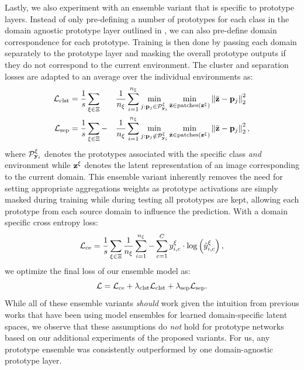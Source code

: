 Lastly, we also experiment with an ensemble variant that is specific to prototype layers. Instead of only pre-defining a number of prototypes for each class in the domain agnostic prototype layer outlined in , we can also pre-define domain correspondence for each prototype. Training is then done by passing each domain separately to the prototype layer and masking the overall prototype outputs if they do not correspond to the current environment. The cluster and separation losses are adapted to an average over the individual environments as:
\begin{alignat}{3}
\label{eq:prototype_losses_domain}
    \mathcal{L}_{\mathrm{clst}} &= \frac{1}{s} \sum_{\xi \in \Xi} &&\frac{1}{n_\xi} \sum_{i=1}^{n_\xi} \min_{j: \mathbf{p}_{j}\in \mathcal{P}_{\mathbf{y}_i}^\xi} \min_{\Bar{\mathbf{z}} \in \text{patches}(\mathbf{z}^\xi)} \left\|\Bar{\mathbf{z}} - \mathbf{p}_{j}\right\|^2_2\\
    \mathcal{L}_{\mathrm{sep}} &= \frac{1}{s} \sum_{\xi \in \Xi}-&&\frac{1}{n_\xi} \sum_{i=1}^{n_\xi} \min_{j: \mathbf{p}_{j} \notin \mathcal{P}_{\mathbf{y}_i}^\xi} \min_{\Bar{\mathbf{z}} \in \text{patches}(\mathbf{z}^\xi)} \left\|\Bar{\mathbf{z}} - \mathbf{p}_{j}\right\|^2_2,
\end{alignat}
where $\mathcal{P}_{\mathbf{y}_i}^\xi$ denotes the prototypes associated with the specific class \emph{and} environment while $\mathbf{z}^\xi$ denotes the latent representation of an image corresponding to the current domain. This ensemble variant inherently removes the need for setting appropriate aggregations weights as prototype activations are simply masked during training while during testing all prototypes are kept, allowing each prototype from each source domain to influence the prediction.  With a domain specific cross entropy loss:
\begin{equation}
    \mathcal{L}_{\mathrm{ce}} = \frac{1}{s} \sum_{\xi \in \Xi} \frac{1}{n_\xi} \sum_{i=1}^{n_\xi} -\sum_{c=1}^{C} y_{i, c}^{\xi} \cdot \log \left(\hat{y}_{i, c}^{\xi}\right),
\end{equation}
we optimize the final loss of our ensemble model as:
\begin{equation}
    \mathcal{L} = \mathcal{L}_{\mathrm{ce}} + \lambda_{\mathrm{clst}} \mathcal{L}_{\mathrm{clst}} + \lambda_{\mathrm{sep}} \mathcal{L}_{\mathrm{sep}}.
\end{equation}
While all of these ensemble variants \emph{should} work given the intuition from previous works that have been using model ensembles for learned domain-specific latent spaces, we observe that these assumptions do \emph{not} hold for prototype networks based on our additional experiments of the proposed variants. For us, any prototype ensemble was consistently outperformed by one domain-agnostic prototype layer. 

